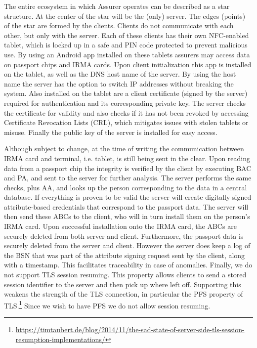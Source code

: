 The entire ecosystem in which Assurer operates can be described as a star structure. At the center of the star will be the (only) server. The edges (points) of the star are formed by the clients. Clients do not communicate with each other, but only with the server. Each of these clients has their own NFC-enabled tablet, which is locked up in a safe and PIN code protected to prevent malicious use. By using an Android app installed on these tablets assurers may access data on passport chips and IRMA cards. Upon client initialization this app is installed on the tablet, as well as the DNS host name of the server. By using the host name the server has the option to switch IP addresses without breaking the system. Also installed on the tablet are a client certificate (signed by the server) required for authentication and its corresponding private key. The server checks the certificate for validity and also checks if it has not been revoked by accessing Certificate Revocation Lists (CRL), which mitigates issues with stolen tablets or misuse. Finally the public key of the server is installed for easy access.

Although subject to change, at the time of writing the communication between IRMA card and terminal, i.e. tablet, is still being sent in the clear. Upon reading data from a passport chip the integrity is verified by the client by executing BAC and PA, and sent to the server for further analysis. The server performs the same checks, plus AA, and looks up the person corresponding to the data in a central database. If everything is proven to be valid the server will create digitally signed attribute-based credentials that correspond to the passport data. The server will then send these ABCs to the client, who will in turn install them on the person's IRMA card. Upon successful installation onto the IRMA card, the ABCs are securely deleted from both server and client. Furthermore, the passport data is securely deleted from the server and client. However the server does keep a log of the BSN that was part of the attribute signing request sent by the client, along with a timestamp. This facilitates traceability in case of anomalies. Finally, we do not support TLS session resuming. This property allows clients to send a stored session identifier to the server and then pick up where left off. Supporting this weakens the strength of the TLS connection, in particular the PFS property of TLS.\footnote{\url{https://timtaubert.de/blog/2014/11/the-sad-state-of-server-side-tls-session-resumption-implementations/}} Since we wish to have PFS we do not allow session resuming.


